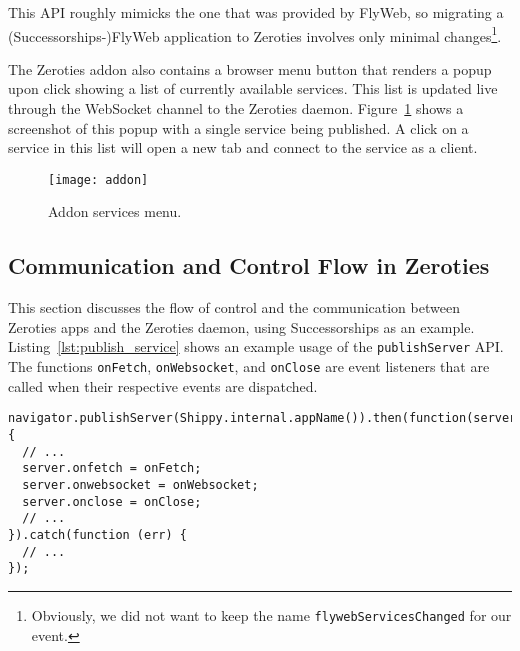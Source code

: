 This API roughly mimicks the one that was provided by FlyWeb, so migrating a (Successorships-)FlyWeb application to Zeroties involves only minimal changes\footnote{Obviously, we did not want to keep the name \texttt{flywebServicesChanged} for our event.}.

The Zeroties addon also contains a browser menu button that renders a popup upon click showing a list of currently available services.
This list is updated live through the WebSocket channel to the Zeroties daemon.
Figure~\ref{fig:addon} shows a screenshot of this popup with a single service being published.
A click on a service in this list will open a new tab and connect to the service as a client.

\begin{figure}[h]
    \centering
    \texttt{[image: addon]}
    \caption{Addon services menu.}
    \label{fig:addon}
\end{figure}




\subsection{Communication and Control Flow in Zeroties}
\label{sub:communication}

This section discusses the flow of control and the communication between Zeroties apps and the Zeroties daemon, using Successorships as an example.
Listing~\ref{lst:publish_service} shows an example usage of the \texttt{publishServer} API.
The functions \texttt{onFetch}, \texttt{onWebsocket}, and \texttt{onClose} are event listeners that are called when their respective events are dispatched.

\begin{lstlisting}[caption={Publishing of a service},label={lst:publish_service}]
navigator.publishServer(Shippy.internal.appName()).then(function(server) {
  // ...
  server.onfetch = onFetch;
  server.onwebsocket = onWebsocket;
  server.onclose = onClose;
  // ...
}).catch(function (err) {
  // ...
});
\end{lstlisting}

